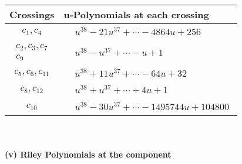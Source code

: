\documentclass[1p]{elsarticle_modified}
\theoremstyle{definition}
\begin{document}
\begin{tabular}{m{50pt}|m{274pt}}
Crossings & \hspace{64pt}u-Polynomials at each crossing \\
\hline $$\begin{aligned}c_{1},c_{4}\end{aligned}$$&$\begin{aligned}
&u^{38}-21 u^{37}+\cdots-4864 u+256
\end{aligned}$\\
\hline $$\begin{aligned}c_{2},c_{3},c_{7}\\c_{9}\end{aligned}$$&$\begin{aligned}
&u^{38}- u^{37}+\cdots- u+1
\end{aligned}$\\
\hline $$\begin{aligned}c_{5},c_{6},c_{11}\end{aligned}$$&$\begin{aligned}
&u^{38}+11 u^{37}+\cdots-64 u+32
\end{aligned}$\\
\hline $$\begin{aligned}c_{8},c_{12}\end{aligned}$$&$\begin{aligned}
&u^{38}+u^{37}+\cdots+4 u+1
\end{aligned}$\\
\hline $$\begin{aligned}c_{10}\end{aligned}$$&$\begin{aligned}
&u^{38}-30 u^{37}+\cdots-1495744 u+104800
\end{aligned}$\\
\hline
\end{tabular}\\~\\
\newpage\renewcommand{\arraystretch}{1}
\flushleft \textbf{(v) Riley Polynomials at the component}\newline \\
\end{document}
